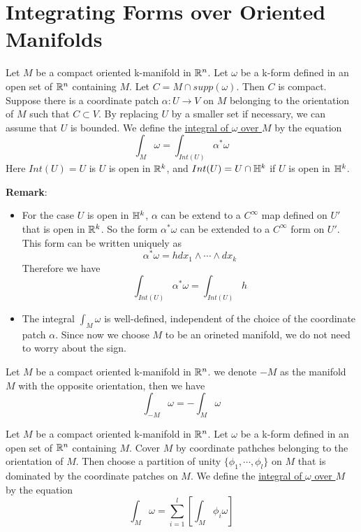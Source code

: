 \section{Integrating Forms over Oriented Manifolds}

\begin{definition}
    Let $M$ be a compact oriented k-manifold in $\mathbb{R}^n$. Let $\omega$ be a k-form defined in an open set of $\mathbb{R}^n$ containing $M$. Let $C=M \cap supp(\omega)$. 
    Then $C$ is compact. Suppose there is a coordinate patch $\alpha:U \longrightarrow V$ on $M$ belonging to the orientation of $M$ such that $C\subset V$. By replacing $U$ by a smaller set if necessary, we can assume that $U$ is bounded. We define 
    the \underline{integral of $\omega$ over $M$} by the equation
    $$\int_M\omega=\int_{Int(U)}\alpha^*\omega$$
    Here $Int(U)=U$ is $U$ is open in $\mathbb{R}^k$, and $Int(U)=U\cap\mathbb{H}^k$ if $U$ is open in $\mathbb{H}^k$.
\end{definition}

\noindent\textbf{Remark}:
\begin{itemize}
    \item For the case $U$ is open in $\mathbb{H}^k$, $\alpha$ can be extend to a $C^{\infty}$ map defined on $U'$ that is open in $\mathbb{R}^k$. So the form $\alpha^*\omega$ can be extended to a $C^{\infty}$ form on $U'$. This form can be written uniquely as $$\alpha^*\omega=h dx_1\wedge \cdots\wedge dx_k$$
    Therefore we have $$\int_{Int(U)}\alpha^*\omega=\int_{Int(U)}h$$
    \item The integral $\int_M\omega$ is well-defined, independent of the choice of the coordinate patch $\alpha$. Since now we choose $M$ to be an orineted manifold, we do not need to worry about the sign.
\end{itemize}

\begin{definition}
    Let $M$ be a compact oriented k-manifold in $\mathbb{R}^n$. we denote $-M$ as the manifold $M$ with the opposite orientation, then we have $$\int_{-M}\omega=-\int_M\omega$$
\end{definition}

\begin{definition}
    Let $M$ be a compact oriented k-manifold in $\mathbb{R}^n$. Let $\omega$ be a k-form defined in an open set of $\mathbb{R}^n$ containing $M$. Cover $M$ by coordinate pathches belonging to the orientation of $M$. 
    Then choose a partition of unity $\{\phi_1,\cdots,\phi_l\}$ on $M$ that is dominated by the coordinate patches on $M$. 
    We define the \underline{integral of $\omega$ over $M$} by the equation $$\int_M\omega=\sum_{i=1}^l[\int_M\phi_i\omega]$$
\end{definition}

